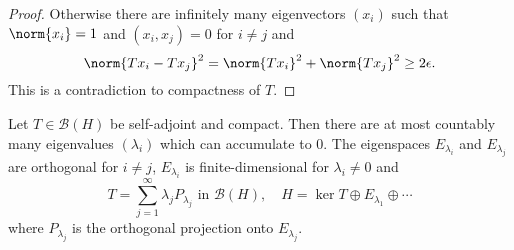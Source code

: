 \documentclass{article}
\begin{document}
\begin{proof}
    Otherwise there are infinitely many eigenvectors $(x_i)$ such that $\norm{x_i} = 1$ and $(x_i, x_j) = 0$ for $i \neq j$ and
    \begin{equation*}
        \norm{T x_i - T x_j}^2 = \norm{T x_i}^2 + \norm{T x_j}^2 \geq 2 \epsilon.
    \end{equation*}
    This is a contradiction to compactness of $T$.
\end{proof}

\begin{thm}
    Let $T \in \mathcal{B}(H)$ be self-adjoint and compact.
    Then there are at most countably many eigenvalues $(\lambda_i)$ which can accumulate to $0$.
    The eigenspaces $E_{\lambda_i}$ and $E_{\lambda_j}$ are orthogonal for $i \neq j$, $E_{\lambda_i}$ is finite-dimensional for $\lambda_i \neq 0$ and
    \begin{equation*}
        T = \sum_{j = 1}^\infty \lambda_j P_{\lambda_j} \text{ in } \mathcal{B}(H), \quad H = \ker T \oplus E_{\lambda_1} \oplus \dotsb
    \end{equation*}
    where $P_{\lambda_j}$ is the orthogonal projection onto $E_{\lambda_j}$.
\end{thm}
\end{document}
